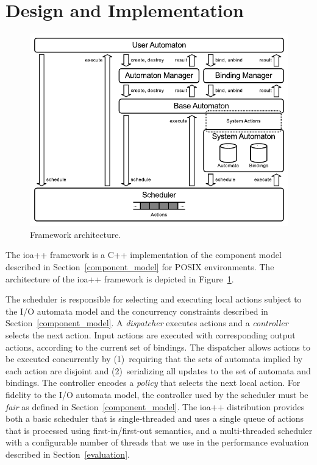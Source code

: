 \section{Design and Implementation\label{design}}

\begin{figure}
\center
\includegraphics[width=.6\columnwidth]{architecture}
\caption{Framework architecture.}
\label{framework_architecture}
\end{figure}

The ioa++ framework is a C++ implementation of the component model described in Section~\ref{component_model} for POSIX environments.
The architecture of the ioa++ framework is depicted in Figure~\ref{framework_architecture}.

The scheduler is responsible for selecting and executing local actions subject to the I/O automata model and the concurrency constraints described in Section~\ref{component_model}.
A \emph{dispatcher} executes actions and a \emph{controller} selects the next action.
Input actions are executed with corresponding output actions, according to the current set of bindings.
The dispatcher allows actions to be executed concurrently by (1)~requiring that the sets of automata implied by each action are disjoint and (2)~serializing all updates to the set of automata and bindings.
The controller encodes a \emph{policy} that selects the next local action.
For fidelity to the I/O automata model, the controller used by the scheduler must be \emph{fair} as defined in Section~\ref{component_model}.
The ioa++ distribution provides both a basic scheduler that is single-threaded and uses a single queue of actions that is processed using first-in/first-out semantics, and a multi-threaded scheduler with a configurable number of threads that we use in the performance evaluation described in Section~\ref{evaluation}.

